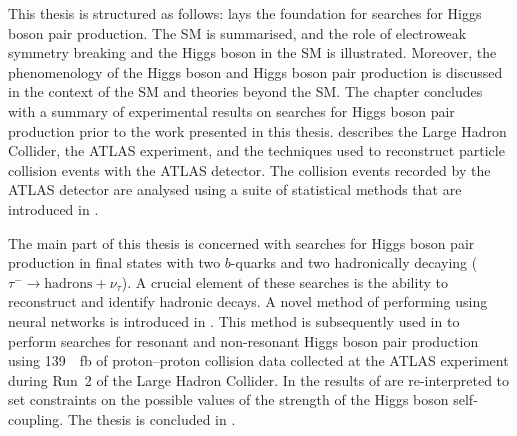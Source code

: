 







This thesis is structured as follows:  lays the
foundation for searches for Higgs boson pair production. The SM is summarised,
and the role of electroweak symmetry breaking and the Higgs boson in the SM is
illustrated. Moreover, the phenomenology of the Higgs boson and Higgs boson pair
production is discussed in the context of the SM and theories beyond the SM. The
chapter concludes with a summary of experimental results on searches for Higgs
boson pair production prior to the work presented in this thesis.
 describes the Large Hadron Collider, the ATLAS
experiment, and the techniques used to reconstruct particle collision events
with the ATLAS detector. The collision events recorded by the ATLAS detector are
analysed using a suite of statistical methods that are introduced in
.

The main part of this thesis is concerned with searches for Higgs boson pair
production in final states with two $b$-quarks and two hadronically decaying
\tauleptons ($\tau^{-} \to \text{hadrons} + \nu_\tau$). A crucial element of
these searches is the ability to reconstruct and identify hadronic \taulepton
decays. A novel method of performing \tauid using neural networks is
introduced in . This method is subsequently used in
 to perform searches for resonant and non-resonant Higgs boson
pair production using \SI{139}{\per\femto\barn} of proton--proton collision data
collected at the ATLAS experiment during Run~2 of the Large Hadron Collider. In
 the results of  are
re-interpreted to set constraints on the possible values of the strength of the
Higgs boson self-coupling. The thesis is concluded in .




